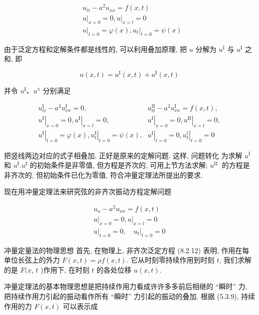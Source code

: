 $$
\begin{aligned}
& u_{t t}-a^{2} u_{x x}=f(x, t) \\
& \left.u\right|_{x=0}=0,\left.u\right|_{x=l}=0 \\
& \left.u\right|_{t=0}=\varphi(x),\left.u_{t}\right|_{t=0}=\psi(x)
\end{aligned}
$$

由于泛定方程和定解条件都是线性的, 可以利用叠加原理, 把 $u$ 分解为 $u^{\mathrm{I}}$ 与 $u^{\mathrm{I}}$ 之和, 即

$$
u(x, t)=u^{\mathrm{I}}(x, t)+u^{\mathrm{I}}(x, t)
$$

并令 $u^{\mathrm{I}} 、 u^{\mathbb{1}}$ 分别满足

$$
\begin{array}{l|l}
u_{t t}^{\mathrm{I}}-a^{2} u_{x x}^{\mathrm{I}}=0, & u_{t t}^{\mathrm{II}}-a^{2} u_{x x}^{\mathrm{I}}=f(x, t), \\
\left.u^{\mathrm{I}}\right|_{x=0}=0,\left.u^{\mathrm{I}}\right|_{x=l}=0, & \left.u^{\mathrm{I}}\right|_{x=0}=0,\left.u^{\mathrm{II}}\right|_{x=l}=0, \\
\left.u^{\mathrm{I}}\right|_{t=0}=\varphi(x),\left.u_{t}^{\mathrm{I}}\right|_{t=0}=\psi(x) . & \left.u^{\mathrm{I}}\right|_{t=0}=0,\left.u_{t}^{\mathbb{I}}\right|_{t=0}=0
\end{array}
$$

把竖线两边对应的式子相叠加, 正好是原来的定解问题. 这样, 问题转化
为求解 $u^{\mathrm{I}}$ 和 $u^{\mathrm{I}} . u^{\mathrm{I}}$ 的初始条件是非零值, 但方程是齐次的, 可用上节方法求解; $u^{\text {II }}$ 的方程是非齐次的, 但初始条件已化为零值, 符合冲量定理法所提出的要求.

现在用冲量定理法来研究弦的非齐次振动方程定解问题

$$
\begin{gathered}
u_{u}-a^{2} u_{x x}=f(x, t) \\
\left.u\right|_{x=0}=0,\left.u\right|_{x=l}=0 \\
\left.u\right|_{t=0}=0,\left.\quad u_{t}\right|_{t=0}=0
\end{gathered}
$$

冲量定量法的物理思想
首先, 在物理上, 非齐次泛定方程 (8.2.12) 表明, 作用在每单位长弦上的外力 $F(x, t)=\rho f(x, t)$. 它从时刻零持续作用到时刻 $t$, 我们求解的是 $F(x$, $t$ )作用下, 在时刻 $t$ 的各处位移 $u(x, t)$.

冲量定理法的基本物理思想是把持续作用力看成许许多多前后相继的 “瞬时” 力, 把持续作用力引起的振动看作所有 “瞬时” 力引起的振动的叠加. 根据 (5.3.9), 持续作用的力 $F(x, t)$ 可以表示成

